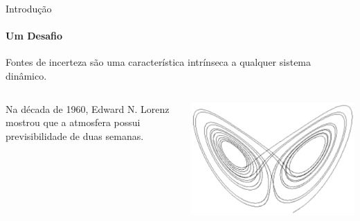 \documentclass[10pt,aspectratio=169]{beamer}
\begin{document}
\begin{frame}[fragile]{Introdução}
\framesubtitle{Um Desafio}
  Fontes de incerteza são uma característica intrínseca a qualquer sistema dinâmico.\\
  \begin{columns}[onlytextwidth,T]
    \column{\dimexpr\linewidth-43mm-5mm}
      \parbox{\linewidth}
      {\vspace{0.4cm} 
        Na década de 1960, Edward N. Lorenz mostrou que a atmosfera possui previsibilidade de duas semanas.
      } \hfill
    \column{24mm}
      \includegraphics[scale=0.27]{figs/lorenz_attractor.pdf} \hfill
    \column{12mm}

\end{columns}
\end{frame}
\end{document}
